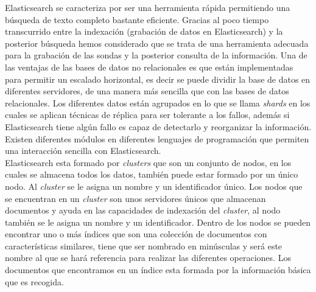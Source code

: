Elasticsearch se caracteriza por ser una herramienta rápida permitiendo una búsqueda de texto completo bastante eficiente. Gracias al poco tiempo transcurrido entre la indexación (grabación de datos en Elasticsearch) y la posterior búsqueda hemos considerado que se trata de una herramienta adecuada para la grabación de las sondas y la posterior consulta de la información. Una de las ventajas de las bases de datos no relacionales es que están implementadas para permitir un escalado horizontal, es decir se puede dividir la base de datos en diferentes servidores, de una manera más sencilla que con las bases de datos relacionales. Los diferentes datos están agrupados en lo que se llama \textit{shards} en los cuales se aplican técnicas de réplica para ser tolerante a los fallos, además si Elasticsearch tiene algún fallo es capaz de detectarlo y reorganizar la información. Existen diferentes módulos en diferentes lenguajes de programación que permiten una interacción sencilla con Elasticsearch.\cite{elastic2}\\

Elasticsearch esta formado por \textit{clusters} que son un conjunto de nodos, en los cuales se almacena todos los datos, también puede estar formado por un único nodo. Al \textit{cluster} se le asigna un nombre y un identificador único. Los nodos que se encuentran en un \textit{cluster} son unos servidores únicos que almacenan documentos y ayuda en las capacidades de indexación del \textit{cluster}, al nodo también se le asigna un nombre y un identificador. Dentro de los nodos se pueden encontrar uno o más índices que son una colección de documentos con características similares, tiene que ser nombrado en minúsculas y será este nombre al que se hará referencia para realizar las diferentes operaciones. Los documentos que encontramos en un índice esta formada por la información básica que es recogida.\cite{elastic3}\\



